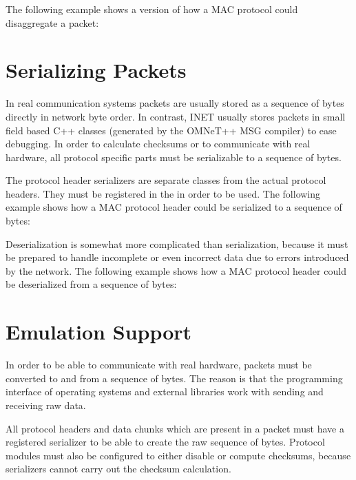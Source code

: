 
The following example shows a version of how a MAC protocol could disaggregate a
packet:


\section{Serializing Packets}

In real communication systems packets are usually stored as a sequence of bytes
directly in network byte order. In contrast, INET usually stores packets in
small field based C++ classes (generated by the OMNeT++ MSG compiler) to ease
debugging. In order to calculate checksums or to communicate with real hardware,
all protocol specific parts must be serializable to a sequence of bytes.

The protocol header serializers are separate classes from the actual protocol
headers. They must be registered in the  in
order to be used. The following example shows how a MAC protocol header could be
serialized to a sequence of bytes:


Deserialization is somewhat more complicated than serialization, because it must
be prepared to handle incomplete or even incorrect data due to errors introduced
by the network. The following example shows how a MAC protocol header could be
deserialized from a sequence of bytes:


\section{Emulation Support}

In order to be able to communicate with real hardware, packets must be converted
to and from a sequence of bytes. The reason is that the programming interface of
operating systems and external libraries work with sending and receiving raw
data.

All protocol headers and data chunks which are present in a packet must have a
registered serializer to be able to create the raw sequence of bytes. Protocol
modules must also be configured to either disable or compute checksums, because
serializers cannot carry out the checksum calculation.

